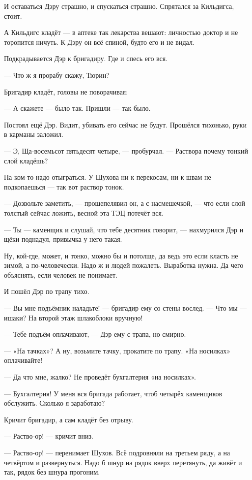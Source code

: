 И оставаться Дэру страшно, и спускаться страшно. Спрятался за Кильдигса, стоит.

А Кильдигс кладёт --- в аптеке так лекарства вешают: личностью доктор и не торопится ничуть. К
Дэру он всё спиной, будто его и не видал.

Подкрадывается Дэр к бригадиру. Где и спесь его вся.

--- Что ж я прорабу скажу, Тюрин?

Бригадир кладёт, головы не поворачивая:

--- А скажете --- было так. Пришли --- так было.

Постоял ещё Дэр. Видит, убивать его сейчас не будут. Прошёлся тихонько, руки в карманы
заложил.

--- Э, Ща-восемьсот пятьдесят четыре, --- пробурчал. --- Раствора почему тонкий слой кладёшь?

На ком-то надо отыграться. У Шухова ни к перекосам, ни к швам не подкопаешься --- так вот
раствор тонок.

--- Дозвольте заметить, --- прошепелявил он, а с насмешечкой, --- что если слой толстый сейчас
ложить, весной эта ТЭЦ потечёт вся.

--- Ты --- каменщик и слушай, что тебе десятник говорит, --- нахмурился Дэр и щёки поднадул,
привычка у него такая.

Ну, кой-где, может, и тонко, можно бы и потолще, да ведь это если класть не зимой, а
по-человечески. Надо ж и людей пожалеть. Выработка нужна. Да чего объяснять, если человек не
понимает.

И пошёл Дэр по трапу тихо.

--- Вы мне подъёмник наладьте! --- бригадир ему со стены вослед. --- Что мы --- ишаки? На второй этаж
шлакоблоки вручную!

--- Тебе подъём оплачивают, --- Дэр ему с трапа, но смирно.

--- «На тачках»? А ну, возьмите тачку, прокатите по трапу. «На носилках» оплачивайте!

--- Да что мне, жалко? Не проведёт бухгалтерия «на носилках».

--- Бухгалтерия! У меня вся бригада работает, чтоб четырёх каменщиков обслужить. Сколько я
заработаю?

Кричит бригадир, а сам кладёт без отрыву.

--- Раство-ор! --- кричит вниз.

--- Раство-ор! --- перенимает Шухов. Всё подровняли на третьем ряду, а на четвёртом и
развернуться. Надо б шнур на рядок вверх перетянуть, да живёт и так, рядок без шнура прогоним.

